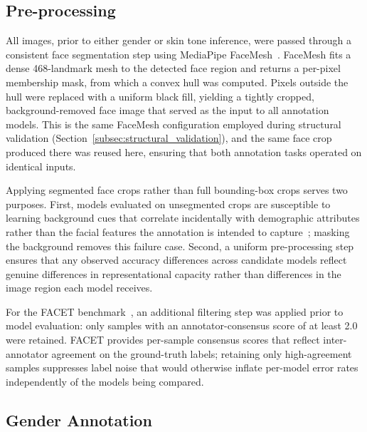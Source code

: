 \subsection{Pre-processing}
\label{sec:annotation_preprocessing}

All images, prior to either gender or skin tone inference, were passed through a consistent face segmentation step using MediaPipe FaceMesh~\cite{Kartynnik_2019_FaceMesh}. FaceMesh fits a dense 468-landmark mesh to the detected face region and returns a per-pixel membership mask, from which a convex hull was computed. Pixels outside the hull were replaced with a uniform black fill, yielding a tightly cropped, background-removed face image that served as the input to all annotation models. This is the same FaceMesh configuration employed during structural validation (Section~\ref{subsec:structural_validation}), and the same face crop produced there was reused here, ensuring that both annotation tasks operated on identical inputs.

Applying segmented face crops rather than full bounding-box crops serves two purposes. First, models evaluated on unsegmented crops are susceptible to learning background cues that correlate incidentally with demographic attributes rather than the facial features the annotation is intended to capture~\cite{Matias_2024_EnhancingFairnessMST}; masking the background removes this failure case. Second, a uniform pre-processing step ensures that any observed accuracy differences across candidate models reflect genuine differences in representational capacity rather than differences in the image region each model receives.

For the FACET benchmark~\cite{Gustafson_2023_FACET}, an additional filtering step was applied prior to model evaluation: only samples with an annotator-consensus score of at least 2.0 were retained. FACET provides per-sample consensus scores that reflect inter-annotator agreement on the ground-truth labels; retaining only high-agreement samples suppresses label noise that would otherwise inflate per-model error rates independently of the models being compared.

\subsection{Gender Annotation}
\label{sec:gender_annotation}

